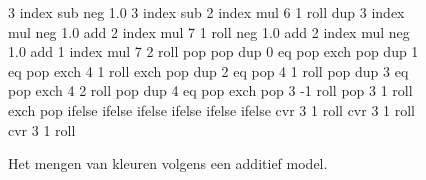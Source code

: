 \begin{figure}
{{   3 index sub neg %
   1.0 3 index sub %
   2 index mul %
   6 1 roll %
   dup 3 index mul neg 1.0 add %
   2 index mul %
   7 1 roll %
   neg 1.0 add %
   2 index mul neg 1.0  add %
   1 index mul %
   7 2 roll %
   pop pop %
   dup 0 eq %
   { %
   pop exch pop
   }
   { dup 1 eq %
     { %
   pop exch 4 1 roll exch pop
     }
     { dup 2 eq %
       { %
       pop 4 1 roll pop
       }
       { dup 3 eq %
         { %
         pop exch 4 2 roll pop
         }
         { dup 4 eq %
           { %
           pop exch pop 3 -1 roll
           }
           { %
           pop 3 1 roll exch pop
           }
           ifelse
         }
         ifelse %
       }
       ifelse %
     }
     ifelse %
   }
   ifelse %
 }
 ifelse %
 cvr 3 1 roll cvr 3 1 roll cvr 3 1 roll 
}

  \begin{adjustbox}{minipage=\textwidth, scale=0.55}
  \centering
  \end{adjustbox}
  \caption{Het mengen van kleuren volgens een additief model.}
  \label{fig:fw-kleur}
\end{figure}

